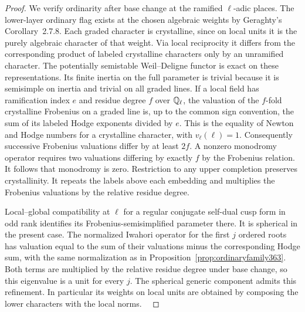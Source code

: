 \documentclass[a4paper,11pt]{article}
\theoremstyle{definition}
\theoremstyle{remark}
\numberwithin{equation}{section}
\begin{document}
\begin{proof}
We verify ordinarity after base change at the ramified
\(\ell\)-adic places. The lower-layer ordinary flag exists
at the chosen algebraic weights by Geraghty's
Corollary~2.7.8. Each graded character is crystalline,
since on local units it is the purely algebraic character
of that weight. Via local reciprocity it differs from
the corresponding product of labeled crystalline characters
only by an unramified character. The potentially semistable
Weil--Deligne functor is exact on these representations.
Its finite inertia on the full parameter is trivial because
it is semisimple on inertia and trivial on all graded lines.
If a local field has ramification index \(e\) and residue
degree \(f\) over \(\mathbb Q_\ell\), the valuation of the
\(f\)-fold crystalline Frobenius on a graded line is, up
to the common sign convention, the sum of its labeled
Hodge exponents divided by \(e\). This is the equality of
Newton and Hodge numbers for a crystalline character, with
\(v_\ell(\ell)=1\). Consequently successive Frobenius
valuations differ by at least \(2f\). A nonzero monodromy
operator requires two valuations differing by exactly \(f\)
by the Frobenius relation. It follows that monodromy is zero.
Restriction to any upper completion preserves crystallinity.
It repeats the labels above each embedding and multiplies
the Frobenius valuations by the relative residue degree.

Local--global compatibility at \(\ell\) for a regular
conjugate self-dual cusp form in odd rank identifies its
Frobenius-semisimplified parameter there. It is spherical
in the present case. The normalized Iwahori operator for the
first \(j\) ordered roots has valuation equal to the sum of
their valuations minus the corresponding Hodge sum, with
the same normalization as in Proposition~\ref{prop:ordinaryfamily363}.
Both terms are multiplied by the relative residue degree
under base change, so this eigenvalue is a unit for every
\(j\). The spherical generic component admits this refinement.
In particular its weights on local units are obtained by composing
the lower characters with the local norms.
~\cite{VII-V-lgp361,VII-V-geraghty363}


\end{proof}
\end{document}
